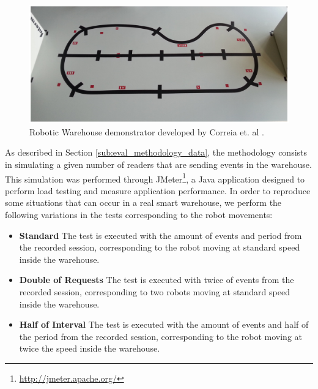         \begin{figure}[ht!]
          \centering
          \includegraphics[width=\textwidth]{./images/robotic_warehouse}
          \caption[Robotic Warehouse demonstrator.]{Robotic Warehouse demonstrator developed by Correia et. al \cite{Correia:Thesis:2014}.}
          \label{fig:robotic_warehouse}
        \end{figure}

        As described in Section \ref{sub:eval_methodology_data}, the methodology consists in simulating a given
        number of readers that are sending events in the warehouse. This simulation was performed through
        JMeter\footnote{\url{http://jmeter.apache.org/}}, a Java application designed to perform load testing
        and measure application performance. In order to reproduce some situations that can occur in a real
        smart warehouse, we perform the following variations in the tests corresponding to the robot movements:

        \begin{itemize}
          \item\textbf{Standard} The test is executed with the amount of events and period from the recorded
          session, corresponding to the robot moving at standard speed inside the warehouse.
          \item\textbf{Double of Requests} The test is executed with twice of events from the recorded session,
          corresponding to two robots moving at standard speed inside the warehouse.
          \item\textbf{Half of Interval} The test is executed with the amount of events and half of the period from
          the recorded session, corresponding to the robot moving at twice the speed inside the warehouse.
        \end{itemize}

